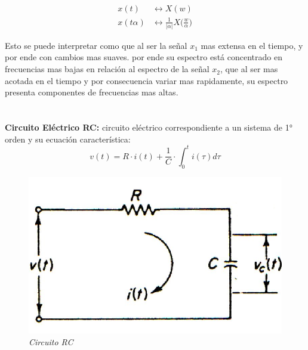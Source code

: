 \documentclass[12pt,a4paper]{report}
\begin{document}
\begin{enumerate}[label=\alph*),left=0pt]
    $$
    \begin{aligned}
      x(t) &\leftrightarrow X(w) \\[6pt]
      x(t\alpha) &\leftrightarrow \frac{1}{|\alpha|}X\Big(\frac{w}{\alpha}\Big)
    \end{aligned}
    $$

    Esto se puede interpretar como que al ser la señal $x_1$ mas extensa en el tiempo, y por ende con cambios mas suaves.
    por ende su espectro está concentrado en frecuencias mas bajas en relación al espectro de la señal $x_2$, que al ser
    mas acotada en el tiempo y por consecuencia variar mas rapidamente, su espectro presenta componentes de frecuencias
    mas altas.

\end{enumerate}

\chapter{}%

  \textbf{Circuito Eléctrico RC:} circuito eléctrico correspondiente a un sistema de 1° orden y su ecuación
  característica:
  $$v(t) = R\cdot i(t) + \frac{1}{C} \cdot \int_{0}^{t} i(\tau) d\tau$$

  \vspace{-1cm}
  \noindent
  \begin{figure}[h]
    \centering
    \begin{minipage}[h]{0.5\textwidth}
      \centering
      \includegraphics[width=1\textwidth]{./images/Ej4.1.jpg}
      \textit{Circuito RC}
    \end{minipage}
  \end{figure}
\end{document}
